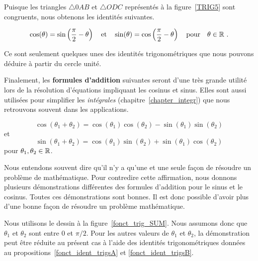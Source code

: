 {Puisque les triangles $\triangle 0AB$ et $\triangle ODC$ représentés à la
figure~\ref{TRIG5} sont congruents, nous obtenons les identités
suivantes.

\begin{prop}
\[
\cos(\theta) = \sin\left(\frac{\pi}{2} - \theta\right)
\quad \text{et} \quad
\sin(\theta) = \cos\left(\frac{\pi}{2} - \theta\right)
\quad \text{pour} \quad \theta \in \mathbb{R} \ .
\]
\label{fonct_ident_trigsB}
\end{prop}

Ce sont seulement quelques unes des identités trigonométriques que
nous pouvons déduire à partir du cercle unité.



Finalement, les {\bfseries formules d'addition}
suivantes seront d'une très grande utilité lors de la résolution
d'équations impliquant les cosinus et sinus.  Elles sont aussi
utilisées pour simplifier les {\em intégrales}
(chapitre~\ref{chapter_integr}) que nous retrouvons souvent dans les
applications.

\begin{prop}
\[
\cos(\theta_1 + \theta_2) = \cos(\theta_1)\cos(\theta_2)
- \sin(\theta_1)\sin(\theta_2)
\]
et
\[
\sin(\theta_1 + \theta_2) = \cos(\theta_1)\sin(\theta_2) +
\sin(\theta_1)\cos(\theta_2)
\]
pour $\theta_1, \theta_2 \in \mathbb{R}$.
\end{prop}

\begin{rmk}[\theory]
Nous entendons souvent dire qu'il n'y a qu'une et une seule façon de
résoudre un problème de mathématique.  Pour contredire cette
affirmation, nous donnons plusieurs démonstrations différentes des
formules d'addition pour le sinus et le cosinus. Toutes ces
démonstrations sont bonnes.  Il est donc possible d'avoir plus d'une
bonne façon de résoudre un problème mathématique.

Nous utilisons le dessin à la figure~\ref{fonct_trig_SUM}.  Nous
assumons donc que $\theta_1$ et $\theta_2$ sont entre $0$ et $\pi/2$.
Pour les autres valeurs de $\theta_1$ et $\theta_2$, la démonstration
peut être réduite au présent cas à l'aide des identités
trigonométriques données
au propositions~\ref{fonct_ident_trigsA} et \ref{fonct_ident_trigsB}.


\end{rmk}}
